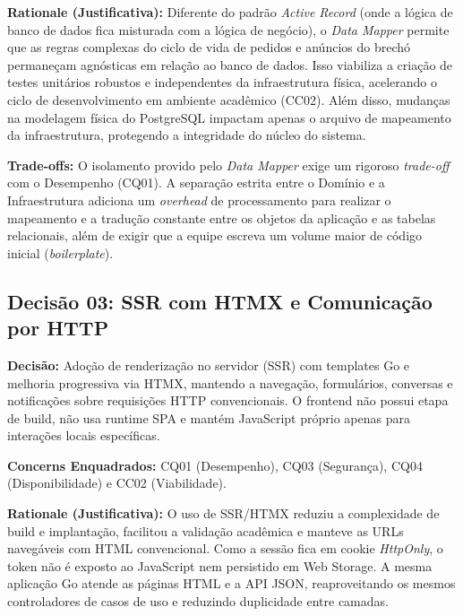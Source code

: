 \documentclass[12pt, a4paper]{article}
\begin{document}
\vspace{0.3cm}
\noindent\textbf{Rationale (Justificativa):} 
Diferente do padrão \textit{Active Record} (onde a lógica de banco de dados fica misturada com a lógica de negócio), o \textit{Data Mapper} permite que as regras complexas do ciclo de vida de pedidos e anúncios do brechó permaneçam agnósticas em relação ao banco de dados. Isso viabiliza a criação de testes unitários robustos e independentes da infraestrutura física, acelerando o ciclo de desenvolvimento em ambiente acadêmico (CC02). Além disso, mudanças na modelagem física do PostgreSQL impactam apenas o arquivo de mapeamento da infraestrutura, protegendo a integridade do núcleo do sistema.

\vspace{0.3cm}
\noindent\textbf{Trade-offs:} O isolamento provido pelo \textit{Data Mapper} exige um rigoroso \textit{trade-off} com o Desempenho (CQ01). A separação estrita entre o Domínio e a Infraestrutura adiciona um \textit{overhead} de processamento para realizar o mapeamento e a tradução constante entre os objetos da aplicação e as tabelas relacionais, além de exigir que a equipe escreva um volume maior de código inicial (\textit{boilerplate}).

\subsection{Decisão 03: SSR com HTMX e Comunicação por HTTP}

\noindent\textbf{Decisão:} Adoção de renderização no servidor (SSR) com templates Go e melhoria progressiva via HTMX, mantendo a navegação, formulários, conversas e notificações sobre requisições HTTP convencionais. O frontend não possui etapa de build, não usa runtime SPA e mantém JavaScript próprio apenas para interações locais específicas.

\vspace{0.3cm}
\noindent\textbf{Concerns Enquadrados:} CQ01 (Desempenho), CQ03 (Segurança), CQ04 (Disponibilidade) e CC02 (Viabilidade).

\vspace{0.3cm}
\noindent\textbf{Rationale (Justificativa):} 
O uso de SSR/HTMX reduziu a complexidade de build e implantação, facilitou a validação acadêmica e manteve as URLs navegáveis com HTML convencional. Como a sessão fica em cookie \textit{HttpOnly}, o token não é exposto ao JavaScript nem persistido em Web Storage. A mesma aplicação Go atende as páginas HTML e a API JSON, reaproveitando os mesmos controladores de casos de uso e reduzindo duplicidade entre camadas.
\end{document}
